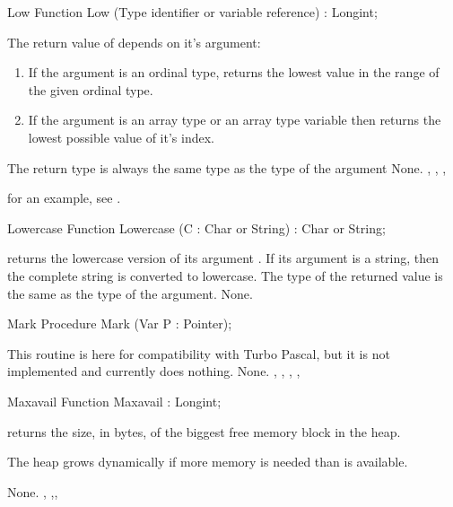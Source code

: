 \begin{function}{Low}
\Declaration
Function Low (Type identifier or variable reference) : Longint;

\Description
 The return value of  depends on it's argument:
\begin{enumerate}
\item If the argument is an ordinal type,  returns the lowest
value in the range of the given ordinal type.
\item If the argument is an array type or an array type variable then
 returns the lowest possible value of it's index.
\end{enumerate}
The return type is always the same type as the type of the argument
\Errors
None.
\SeeAlso
{}, , , 
\end{function}
for an example, see .
\begin{function}{Lowercase}
\Declaration
Function Lowercase (C : Char or String) : Char or String;

\Description
{} returns the lowercase version of its argument .
If its argument is a string, then the complete string is converted to
lowercase. The type of the returned value is the same as the type of the
argument.
\Errors
None.
\SeeAlso
{}
\end{function}


\begin{procedure}{Mark}
\Declaration
Procedure Mark (Var P : Pointer);

\Description
This routine is here for compatibility with Turbo Pascal, but
it is not implemented and currently does nothing.
\Errors
None.
\SeeAlso
{}, , , , 
\end{procedure}

\begin{function}{Maxavail}
\Declaration
Function Maxavail  : Longint;

\Description
{} returns the size, in bytes, of the biggest free memory block in
the heap.
\begin{remark}
The heap grows dynamically if more memory is needed than is available.
\end{remark}
\Errors
None.
\SeeAlso
{}, ,, 
\end{function}

